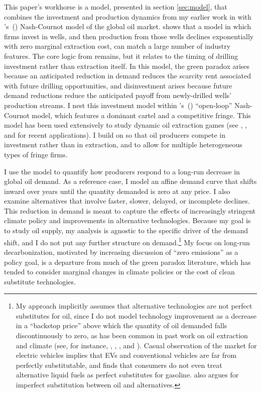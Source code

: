 \documentclass[12pt]{article}
\newcommand\cites[1]{\citeauthor{#1}'s\ (\citeyear{#1})}
\begin{document}
This paper's workhorse is a model, presented in section \ref{sec:model}, that combines the investment and production dynamics from my earlier work in \cite{aks2018} with \cites{salant1976} Nash-Cournot model of the global oil market. \cite{aks2018} shows that a model in which firms invest in wells, and then production from those wells declines exponentially with zero marginal extraction cost, can match a large number of industry features. The core logic from \cite{Hotelling1931} remains, but it relates to the timing of drilling investment rather than extraction itself. In this model, the green paradox arises because an anticipated reduction in demand reduces the scarcity rent associated with future drilling opportunities, and disinvestment arises because future demand reductions reduce the anticipated payoff from newly-drilled wells' production streams. I nest this investment model within \cites{salant1976} ``open-loop'' Nash-Cournot model, which features a dominant cartel and a competitive fringe. This model has been used extensively to study dynamic oil extraction games (see \cite{benchekrounetal2019}, \cite{benchekrounetal2020}, and \cite{balkejinyucel2024} for recent applications). I build on \cite{salant1976} so that oil producers compete in investment rather than in extraction, and to allow for multiple heterogeneous types of fringe firms.

I use the model to quantify how producers respond to a long-run decrease in global oil demand. As a reference case, I model an affine demand curve that shifts inward over years until the quantity demanded is zero at any price. I also examine alternatives that involve faster, slower, delayed, or incomplete declines. This reduction in demand is meant to capture the effects of increasingly stringent climate policy and improvements in alternative technologies. Because my goal is to study oil supply, my analysis is agnostic to the specific driver of the demand shift, and I do not put any further structure on demand.\footnote{My approach implicitly assumes that alternative technologies are not perfect substitutes for oil, since I do not model technology improvement as a decrease in a ``backstop price'' above which the quantity of oil demanded falls discontinuously to zero, as has been common in past work on oil extraction and climate (see, for instance, \cite{fischersalant2017}, \cite{healschlenker}, \cite{benchekrounetal2020}, and \cite{vanderMeijdenetal2023}). Casual observation of the market for electric vehicles implies that EVs and conventional vehicles are far from perfectly substitutable, and \cite{anderson2012} finds that consumers do not even treat alternative liquid fuels as perfect substitutes for gasoline. \cite{curuksen2023} also argues for imperfect substitution between oil and alternatives.} My focus on long-run decarbonization, motivated by increasing discussion of ``zero emissions'' as a policy goal, is a departure from much of the green paradox literature, which has tended to consider marginal changes in climate policies or the cost of clean substitute technologies.
\end{document}
